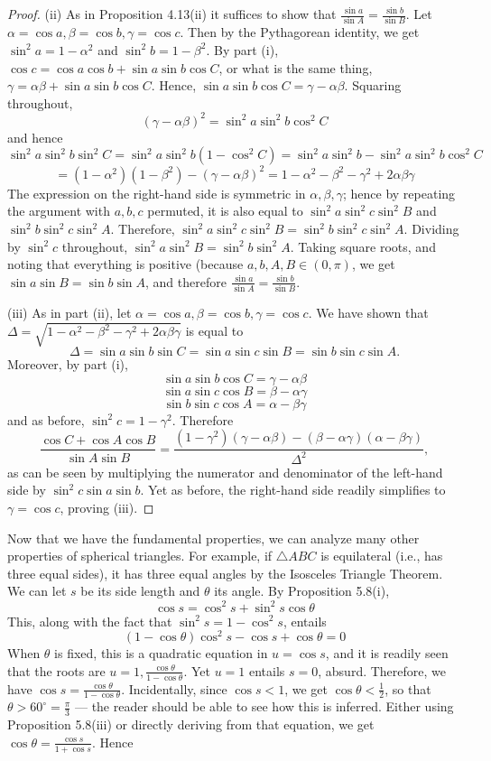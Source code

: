 \documentclass[leqno]{book}
\begin{document}
\begin{proof}
(ii) As in Proposition 4.13(ii) it suffices to show that $\frac{\sin a}{\sin A}=\frac{\sin b}{\sin B}$.  Let $\alpha=\cos a,\beta=\cos b,\gamma=\cos c$.  Then by the Pythagorean identity, we get $\sin^2a=1-\alpha^2$ and $\sin^2b=1-\beta^2$.  By part (i), $\cos c=\cos a\cos b+\sin a\sin b\cos C$, or what is the same thing, $\gamma=\alpha\beta+\sin a\sin b\cos C$.  Hence, $\sin a\sin b\cos C=\gamma-\alpha\beta$.  Squaring throughout,
$$(\gamma-\alpha\beta)^2=\sin^2a\sin^2b\cos^2C$$
and hence
$$\sin^2a\sin^2b\sin^2C=\sin^2a\sin^2b(1-\cos^2C)=\sin^2a\sin^2b-\sin^2a\sin^2b\cos^2C$$
$$=(1-\alpha^2)(1-\beta^2)-(\gamma-\alpha\beta)^2=1-\alpha^2-\beta^2-\gamma^2+2\alpha\beta\gamma$$
The expression on the right-hand side is symmetric in $\alpha,\beta,\gamma$; hence by repeating the argument with $a,b,c$ permuted, it is also equal to $\sin^2a\sin^2c\sin^2B$ and $\sin^2b\sin^2c\sin^2A$.  Therefore, $\sin^2a\sin^2c\sin^2B=\sin^2b\sin^2c\sin^2A$.  Dividing by $\sin^2c$ throughout, $\sin^2a\sin^2B=\sin^2b\sin^2A$.  Taking square roots, and noting that everything is positive (because $a,b,A,B\in(0,\pi)$, we get $\sin a\sin B=\sin b\sin A$, and therefore $\frac{\sin a}{\sin A}=\frac{\sin b}{\sin B}$.

(iii) As in part (ii), let $\alpha=\cos a,\beta=\cos b,\gamma=\cos c$.  We have shown that $\Delta=\sqrt{1-\alpha^2-\beta^2-\gamma^2+2\alpha\beta\gamma}$ is equal to
$$\Delta=\sin a\sin b\sin C=\sin a\sin c\sin B=\sin b\sin c\sin A.$$
Moreover, by part (i),
$$\sin a\sin b\cos C=\gamma-\alpha\beta$$
$$\sin a\sin c\cos B=\beta-\alpha\gamma$$
$$\sin b\sin c\cos A=\alpha-\beta\gamma$$
and as before, $\sin^2c=1-\gamma^2$.  Therefore
$$\frac{\cos C+\cos A\cos B}{\sin A\sin B}=\frac{(1-\gamma^2)(\gamma-\alpha\beta)-(\beta-\alpha\gamma)(\alpha-\beta\gamma)}{\Delta^2},$$
as can be seen by multiplying the numerator and denominator of the left-hand side by $\sin^2c\sin a\sin b$.  Yet as before, the right-hand side readily simplifies to $\gamma=\cos c$, proving (iii).
\end{proof}

\noindent Now that we have the fundamental properties, we can analyze many other properties of spherical triangles.  For example, if $\triangle ABC$ is equilateral (i.e., has three equal sides), it has three equal angles by the Isosceles Triangle Theorem.  We can let $s$ be its side length and $\theta$ its angle.  By Proposition 5.8(i),
$$\cos s=\cos^2s+\sin^2s\cos\theta$$
This, along with the fact that $\sin^2s=1-\cos^2s$, entails
$$(1-\cos\theta)\cos^2s-\cos s+\cos\theta=0$$
When $\theta$ is fixed, this is a quadratic equation in $u=\cos s$, and it is readily seen that the roots are $u=1,\frac{\cos\theta}{1-\cos\theta}$.  Yet $u=1$ entails $s=0$, absurd.  Therefore, we have $\cos s=\frac{\cos\theta}{1-\cos\theta}$.  Incidentally, since $\cos s<1$, we get $\cos\theta<\frac 12$, so that $\theta>60^\circ=\frac{\pi}3$ \---- the reader should be able to see how this is inferred.  Either using Proposition 5.8(iii) or directly deriving from that equation, we get $\cos\theta=\frac{\cos s}{1+\cos s}$.  Hence\\
\end{document}
